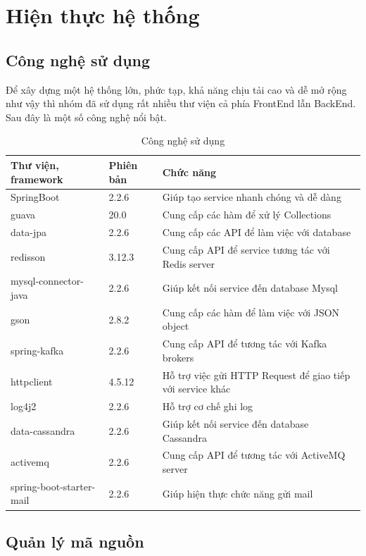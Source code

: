 \chapter{Hiện thực hệ thống}

\section{Công nghệ sử dụng}

	Để xây dựng một hệ thống lớn, phức tạp, khả năng chịu tải cao và dễ mở rộng như vậy thì nhóm đã sử dụng rất nhiều thư viện cả phía FrontEnd lẫn BackEnd. Sau đây là một số công nghệ nổi bật.
	
	\begin{table}[!htp]
		\centering\begin{tabular}{|l|l|m{20em}|}
			\hline 
			Thư viện, framework & Phiên bản & Chức năng\\
			\hline 
			SpringBoot & 2.2.6 & Giúp tạo service nhanh chóng và dễ dàng  \\
			\hline 
			guava & 20.0 & Cung cấp các hàm để xử lý Collections \\
			\hline 
			data-jpa & 2.2.6 & Cung cấp các API để làm việc với database \\
			\hline 
			redisson & 3.12.3 & Cung cấp API để service tương tác với Redis server\\
			\hline 
			mysql-connector-java & 2.2.6 & Giúp kết nối service đến database Mysql \\
			\hline 
			gson & 2.8.2 & Cung cấp các hàm để làm việc với JSON object \\
			\hline 
			spring-kafka &  2.2.6 & Cung cấp API để tương tác với Kafka brokers \\
			\hline 
			httpclient & 4.5.12 & Hỗ trợ việc gửi HTTP Request để giao tiếp với service khác \\
			\hline 
			log4j2 &  2.2.6 & Hỗ trợ cơ chế ghi log \\
			\hline 
			data-cassandra & 2.2.6 & Giúp kết nối service đến database Cassandra \\
			\hline 
			activemq & 2.2.6  & Cung cấp API để tương tác với ActiveMQ server \\
			\hline 
			spring-boot-starter-mail & 2.2.6 & Giúp hiện thực chức năng gửi mail \\
			\hline
		\end{tabular}
		\caption{Công nghệ sử dụng}
	\end{table}


\section{Quản lý mã nguồn}
	
